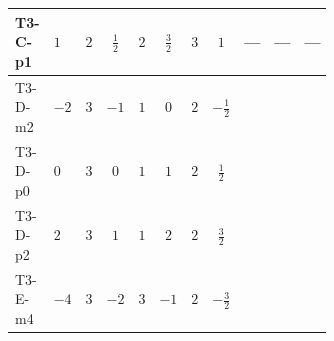 \documentclass[8pt]{article}
\begin{document}
\begin{landscape}
\begin{longtable}{@{}llcccccc >{\raggedright\arraybackslash}p{0.21\linewidth} >{\raggedright\arraybackslash}p{0.21\linewidth} >{\raggedright\arraybackslash}p{0.21\linewidth}@{}}
T3-C-p1 & $1$ & $2$ & $\frac{1}{2}$ & $2$ & $\frac{3}{2}$ & $3$ & $1$ & --- & --- & --- \\
\midrule
T3-D-m2 & $-2$ & $3$ & $-1$ & $1$ & $0$ & $2$ & $-\frac{1}{2}$ & \scriptsize\adjustbox{max width=\linewidth}{$\begin{gathered} +{g_2}^2 (-24 {\lambda_{S_1}^{(1)}}-12 {\lambda_{S_1}^{(A)}})\end{gathered}$} & \scriptsize\adjustbox{max width=\linewidth}{$\begin{gathered} +\frac{3 {\lambda_{HS_1}^{(A)}}^2}{2}\end{gathered}$} & \scriptsize\adjustbox{max width=\linewidth}{$\begin{gathered} +26 {\lambda_{S_1}^{(A)}}^2\end{gathered}$} \\
\midrule
T3-D-p0 & $0$ & $3$ & $0$ & $1$ & $1$ & $2$ & $\frac{1}{2}$ & \scriptsize\adjustbox{max width=\linewidth}{$\begin{gathered} +{g_2}^2 (-24 {\lambda_{S_1}^{(1)}}-12 {\lambda_{S_1}^{(A)}})\end{gathered}$} & \scriptsize\adjustbox{max width=\linewidth}{$\begin{gathered} +\frac{3 {\lambda_{HS_1}^{(A)}}^2}{2}\end{gathered}$} & \scriptsize\adjustbox{max width=\linewidth}{$\begin{gathered} +26 {\lambda_{S_1}^{(A)}}^2\end{gathered}$} \\
\midrule
T3-D-p2 & $2$ & $3$ & $1$ & $1$ & $2$ & $2$ & $\frac{3}{2}$ & \scriptsize\adjustbox{max width=\linewidth}{$\begin{gathered} +{g_2}^2 (-24 {\lambda_{S_1}^{(1)}}-12 {\lambda_{S_1}^{(A)}})\end{gathered}$} & \scriptsize\adjustbox{max width=\linewidth}{$\begin{gathered} +\frac{3 {\lambda_{HS_1}^{(A)}}^2}{2}\end{gathered}$} & \scriptsize\adjustbox{max width=\linewidth}{$\begin{gathered} +26 {\lambda_{S_1}^{(A)}}^2\end{gathered}$} \\
\midrule
T3-E-m4 & $-4$ & $3$ & $-2$ & $3$ & $-1$ & $2$ & $-\frac{3}{2}$ & \scriptsize\adjustbox{max width=\linewidth}{$\begin{gathered} +{g_2}^2 (-24 {\lambda_{S_1}^{(1)}}-12 {\lambda_{S_1}^{(A)}})\end{gathered}$} & \scriptsize\adjustbox{max width=\linewidth}{$\begin{gathered} +\frac{3 {\lambda_{HS_1}^{(A)}}^2}{2}\end{gathered}$} & \scriptsize\adjustbox{max width=\linewidth}{$\begin{gathered} +26 {\lambda_{S_1}^{(A)}}^2\end{gathered}$} \\

\end{longtable}
\end{landscape}
\end{document}
